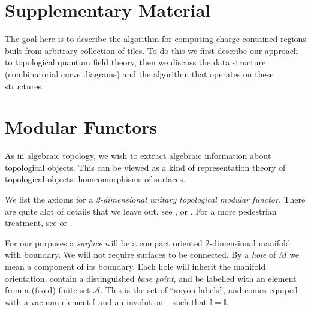 \documentclass[aps, prl, letterpaper, twocolumn, superscriptaddress, notitlepage, 10pt]{revtex4-1}
\newcommand{\vac}{\mathbb{I}}
\begin{document}
\appendix

\section*{Supplementary Material}

The goal here is to describe the algorithm for
computing charge contained regions built from 
arbitrary collection of tiles.
To do this we first describe our approach
to topological quantum field theory,
then we discuss the data structure 
(combinatorial curve diagrams) and the algorithm
that operates on these structures.


%
%

\section{Modular Functors}

As in algebraic topology, we wish to extract
algebraic information about topological objects.
This can be viewed as a kind of representation theory
of topological objects: homeomorphisms of surfaces.

We list the axioms for a 
\emph{2-dimensional unitary topological modular functor}.
There are quite alot of details that we leave out,
see
\cite{Turaev1994}, \cite{Walker1991} or \cite{Bakalov2000}.
For a more pedestrian treatment, see \cite{Freedman2002simulation} or \cite{Beverland2014}.

\newcommand{\F}{\mathscr{H}} %
\newcommand{\C}{\mathbb{C}}
\newcommand{\A}{\mathcal{A}}

For our purposes a \emph{surface} will be a compact
oriented $2$-dimensional manifold with boundary.
We will not require surfaces to be connected.
By a \emph{hole} of $M$ we mean a component of its boundary. %
Each hole will inherit the manifold orientation,
contain a distinguished \emph{base point},
and be labelled with
an element from a (fixed) finite set $\A.$
This is the set of ``anyon labels'', and comes
equiped with a vacuum element $\vac$ 
and an involution $\ \widehat{}\ $ such that $\widehat{\vac}=\vac.$
\end{document}
